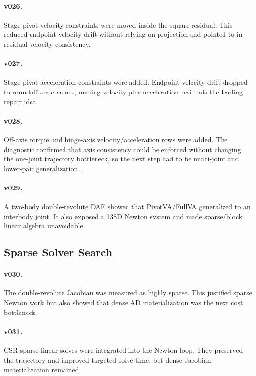 \documentclass[10pt]{article}
\begin{document}
\paragraph{v026.}
Stage pivot-velocity constraints were moved inside the square residual. This
reduced endpoint velocity drift without relying on projection and pointed to
in-residual velocity consistency.

\paragraph{v027.}
Stage pivot-acceleration constraints were added. Endpoint velocity drift
dropped to roundoff-scale values, making velocity-plus-acceleration residuals
the leading repair idea.

\paragraph{v028.}
Off-axis torque and hinge-axis velocity/acceleration rows were added. The
diagnostic confirmed that axis consistency could be enforced without changing
the one-joint trajectory bottleneck, so the next step had to be multi-joint
and lower-pair generalization.

\paragraph{v029.}
A two-body double-revolute DAE showed that PivotVA/FullVA generalized to an
interbody joint. It also exposed a 138D Newton system and made sparse/block
linear algebra unavoidable.

\subsection{Sparse Solver Search}

\paragraph{v030.}
The double-revolute Jacobian was measured as highly sparse. This justified
sparse Newton work but also showed that dense AD materialization was the next
cost bottleneck.

\paragraph{v031.}
CSR sparse linear solves were integrated into the Newton loop. They preserved
the trajectory and improved targeted solve time, but dense Jacobian
materialization remained.
\end{document}
